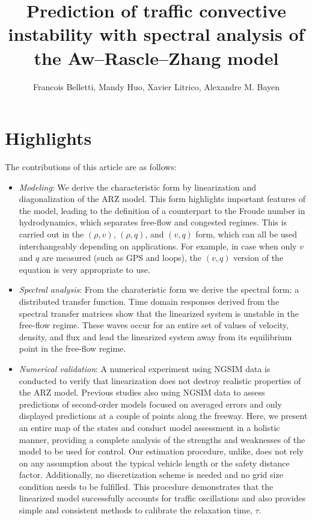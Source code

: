 \documentclass{article}
\begin{document}
\title{Prediction of traffic convective instability with spectral analysis of the Aw--Rascle--Zhang model}

\author{Francois Belletti, Mandy Huo, Xavier Litrico, Alexandre M. Bayen}

\maketitle

\section{Highlights}
The contributions of this article are as follows:

\begin{itemize}
\item \textit{Modeling}: We derive the characteristic form by linearization and diagonalization of the ARZ model. This form highlights important features of the model, leading to the definition of a counterpart to the Froude number in hydrodynamics, which separates free-flow and congested regimes. This is carried out in the $\left(\rho, v \right)$, $\left(\rho, q\right)$, and $\left(v, q\right)$ form, which can all be used interchangeably depending on applications. For example, in case when only $v$ and $q$ are measured (such as GPS and loops), the $\left(v, q\right)$ version of the equation is very appropriate to use.

\item \textit{Spectral analysis}: From the charateristic form we derive the spectral form: a distributed transfer function. Time domain responses derived from the spectral transfer matrices show that the linearized system is unstable in the free-flow regime. These waves occur for an entire set of values of velocity, density, and flux and lead the linearized system away from its equilibrium point in the free-flow regime. 

\item \textit{Numerical validation}: A numerical experiment using NGSIM data is conducted to verify that linearization does not destroy realistic properties of the ARZ model. Previous studies also using NGSIM data to assess predictions of second-order models focused on averaged errors and only displayed predictions at a couple of points along the freeway. Here, we present an entire map of the states and conduct model assessment in a holistic manner, providing a complete analysis of the strengths and weaknesses of the model to be used for control. Our estimation procedure, unlike, does not rely on any assumption about the typical vehicle length or the safety distance factor. Additionally, no discretization scheme is needed and no grid size condition needs to be fulfilled. This procedure demonstrates that the linearized model successfully accounts for traffic oscillations and also provides simple and consistent methods to calibrate the relaxation time, $\tau$.
\end{itemize}
\end{document}
